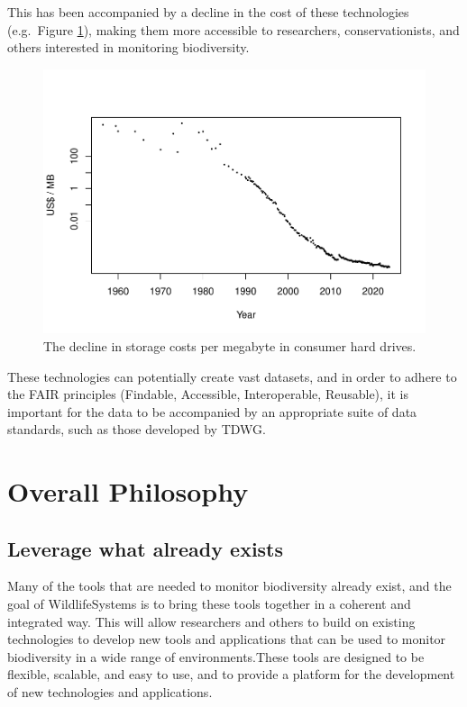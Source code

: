 \documentclass[
]{book}
\begin{document}
This has been accompanied by a decline in the cost of these technologies (e.g.~Figure \ref{fig:storage-costs}), making them more accessible to researchers, conservationists, and others interested in monitoring biodiversity.

\begin{figure}
\centering
\includegraphics{_main_files/figure-latex/storage-costs-1.pdf}
\caption{\label{fig:storage-costs}The decline in storage costs per megabyte in consumer hard drives.}
\end{figure}

These technologies can potentially create vast datasets, and in order to adhere to the FAIR principles (Findable, Accessible, Interoperable, Reusable), it is important for the data to be accompanied by an appropriate suite of data standards, such as those developed by TDWG.

\section{Overall Philosophy}\label{overall-philosophy}

\subsection{Leverage what already exists}\label{leverage-what-already-exists}

Many of the tools that are needed to monitor biodiversity already exist, and the goal of WildlifeSystems is to bring these tools together in a coherent and integrated way. This will allow researchers and others to build on existing technologies to develop new tools and applications that can be used to monitor biodiversity in a wide range of environments.These tools are designed to be flexible, scalable, and easy to use, and to provide a platform for the development of new technologies and applications.
\end{document}
